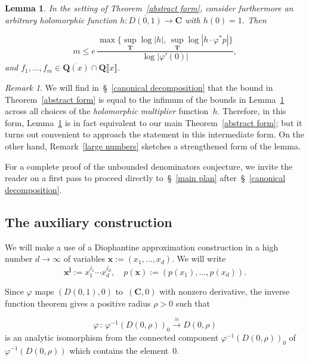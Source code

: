 \documentclass[10pt]{amsart}
\def\SSS{\S}
\def\SSSS{\S}
\def\T{\mathbf{T}}
\def\Q{\mathbf{Q}}
\newtheorem{lemma}[subsubsection]{Lemma}
\theoremstyle{remark}
\newtheorem{remark}[subsubsection]{Remark}
\numberwithin{equation}{subsection}
\def\numequation{\addtocounter{subsubsection}{1}\begin{equation}}
\def\C{\mathbf{C}}
\begin{document}
\begin{lemma}  \label{meromorphic form}
In the setting of Theorem~\ref{abstract form}, consider furthermore an arbitrary holomorphic function $h : \overline{D(0,1)} \to \C$ with $h(0) = 1$. Then
\numequation  \label{meromorphic bound}
m \leq e \, \frac{ \max \big\{  \sup_{\T}{\log{|h|}}, \, \sup_{\T}{\log{|h \cdot \varphi^* p|}}  \big\}  }{\log{|\varphi'(0)|}},
\end{equation}
and $f_1, \ldots, f_m \in \overline{\Q(x)} \cap \Q\llbracket x \rrbracket$. 
\end{lemma}

\begin{remark}
We will find in~\SSSS~\ref{canonical decomposition} that the bound in Theorem~\ref{abstract form} is equal to the infimum of the bounds in Lemma~\ref{meromorphic form} across all choices of the \emph{holomorphic multiplier} function~$h$. Therefore, in this form, Lemma~\ref{meromorphic form} 
is in fact equivalent to our main Theorem~\ref{abstract form}; but it turns out convenient to approach the statement in this intermediate form. 
On the other hand, 
Remark~\ref{large numbers} sketches a strengthened form of the lemma. 
\end{remark}

 For a complete proof of the unbounded denominators conjecture, we invite the reader on a first pass to proceed directly to~\SSS~\ref{main plan} after~\SSS~\ref{canonical decomposition}. 


\subsection{The auxiliary construction} \label{auxiliary construction}


We will make a use of a Diophantine approximation construction in a high number $d \to \infty$ of variables $\mathbf{x} := (x_1, \ldots, x_d)$. We will write 
$$
\mathbf{x^j} := x_1^{j_1} \cdots x_d^{j_d}, \quad   p(\mathbf{x}) := (p(x_1), \ldots, p(x_d)). 
$$

Since $\varphi$ maps $(D(0,1),0)$ to~$(\C,0)$ with nonzero derivative, the inverse function theorem gives a positive radius $\rho > 0$ such that
\numequation  \label{inverse function theorem}
\varphi \, : \, \varphi^{-1}(D(0,\rho))_0 \xrightarrow{\cong} D(0,\rho)
\end{equation}
is an analytic isomorphism from the connected component $\varphi^{-1}(D(0,\rho))_0$
of~$\varphi^{-1}(D(0,\rho))$  which contains the element~$0$.
\end{document}
